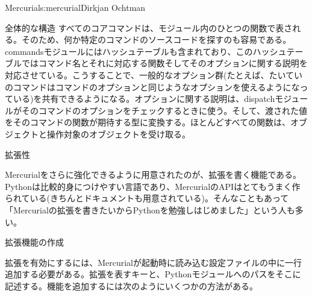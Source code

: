\begin{aosachapter}{Mercurial}{s:mercurial}{Dirkjan Ochtman}
\begin{aosasect1}{全体的な構造}
すべてのコアコマンドは、モジュール内のひとつの関数で表される。そのため、何か特定のコマンドのソースコードを探すのも容易である。commandsモジュールにはハッシュテーブルも含まれており、このハッシュテーブルではコマンド名とそれに対応する関数そしてそのオプションに関する説明を対応させている。こうすることで、一般的なオプション群(たとえば、たいていのコマンドはコマンドのオプションと同じようなオプションを使えるようになっている)を共有できるようになる。オプションに関する説明は、dispatchモジュールがそのコマンドのオプションをチェックするときに使う。そして、渡された値をそのコマンドの関数が期待する型に変換する。ほとんどすべての関数は、オブジェクトと操作対象のオブジェクトを受け取る。

\end{aosasect1}

\begin{aosasect1}{拡張性}

Mercurialをさらに強化できるように用意されたのが、拡張を書く機能である。Pythonは比較的身につけやすい言語であり、MercurialのAPIはとてもうまく作られている(きちんとドキュメントも用意されている)。そんなこともあって「Mercurialの拡張を書きたいからPythonを勉強しはじめました」という人も多い。

\begin{aosasect2}{拡張機能の作成}

拡張を有効にするには、Mercurialが起動時に読み込む設定ファイルの中に一行追加する必要がある。拡張を表すキーと、Pythonモジュールへのパスをそこに記述する。機能を追加するには次のようにいくつかの方法がある。


\end{aosasect2}
\end{aosasect1}
\end{aosachapter}

